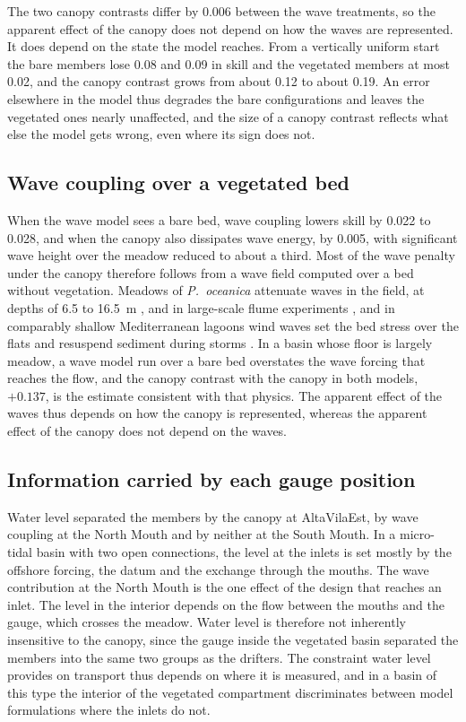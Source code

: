 The two canopy contrasts differ by 0.006 between the wave treatments, so the
apparent effect of the canopy does not depend on how the waves are
represented. It does depend on the state the model reaches. From a vertically
uniform start the bare members lose 0.08 and 0.09 in skill and the vegetated
members at most 0.02, and the canopy contrast grows from about 0.12 to about
0.19. An error elsewhere in the model thus degrades the bare configurations and
leaves the vegetated ones nearly unaffected, and the size of a canopy contrast
reflects what else the model gets wrong, even where its sign does not.

\subsection{Wave coupling over a vegetated bed}

When the wave model sees a bare bed, wave coupling lowers skill by 0.022 to
0.028, and when the canopy also dissipates wave energy, by 0.005, with
significant wave height over the meadow reduced to about a third. Most of the wave penalty
under the canopy therefore follows from a wave field computed over a bed
without vegetation. Meadows of \emph{P.\ oceanica} attenuate waves in the field, at depths of 6.5
to 16.5~m \citep{Infantes2012}, and in large-scale flume experiments
\citep{Prinos2010}, and in comparably shallow Mediterranean
lagoons wind waves set the bed stress over the flats and resuspend sediment
during storms \citep{Carniello2011, Morote2025}. In a basin whose floor is largely meadow, a wave model run over a
bare bed overstates the wave forcing that reaches the flow, and the canopy
contrast with the canopy in both models, $+0.137$, is the estimate consistent
with that physics. The apparent effect of the waves thus depends on how the
canopy is represented, whereas the apparent effect of the canopy does not
depend on the waves.

\subsection{Information carried by each gauge position}

Water level separated the members by the canopy at AltaVilaEst, by wave
coupling at the North Mouth and by neither at the South Mouth. In a
micro-tidal basin with two open connections, the level at the inlets is set
mostly by the offshore forcing, the datum and the exchange through the mouths.
The wave contribution at the North Mouth is the one effect of the design that
reaches an inlet. The level in the interior depends on the flow between the
mouths and the gauge, which crosses the meadow. Water level is therefore not
inherently insensitive to the canopy, since the gauge inside the vegetated
basin separated the members into the same two groups as the drifters. The
constraint water level provides on transport thus depends on where it is
measured, and in a basin of this type the interior of
the vegetated compartment discriminates between model formulations where the
inlets do not.

